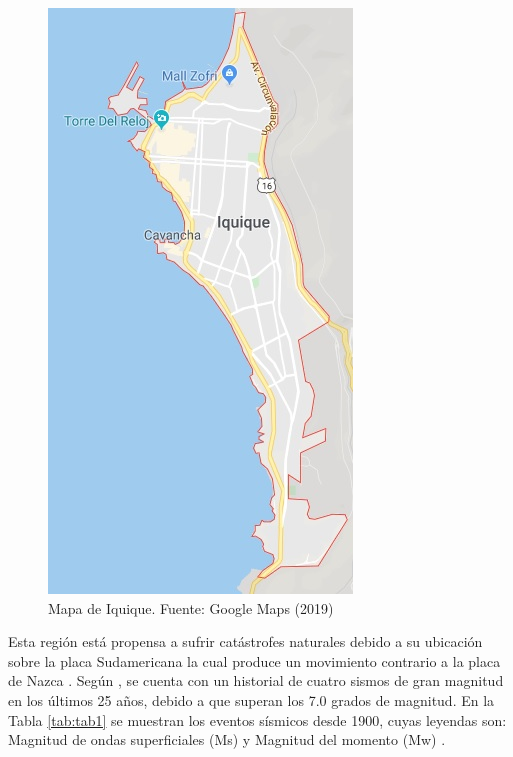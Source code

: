 \documentclass[12pt,a4paper]{article}
\begin{document}
\begin{figure}[h!]
\centering
\includegraphics[scale=0.65]{Figuras/iquique1.jpg}
\caption{Mapa de Iquique. Fuente: Google Maps (2019)}
\label{fig:fig2}
\end{figure}

Esta región está propensa a sufrir catástrofes naturales debido a su ubicación sobre la placa Sudamericana la cual produce un movimiento contrario a la placa de Nazca \citep{sismologia}. Según \citet{emdat}, se cuenta con un historial de cuatro sismos de gran magnitud en los últimos 25 años, debido a que superan los 7.0 grados de magnitud. En la Tabla \ref{tab:tab1} se muestran los eventos sísmicos desde 1900, cuyas leyendas son: Magnitud de ondas superficiales (Ms) y Magnitud del momento (Mw) \citep{sismologia}.
\end{document}
